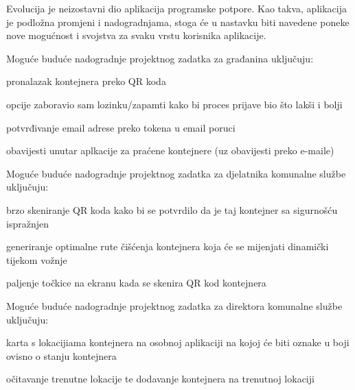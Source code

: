		Evolucija je neizostavni dio aplikacija programske potpore. Kao takva, aplikacija je podložna promjeni i nadogradnjama, stoga će u nastavku biti navedene poneke nove mogućnost i svojstva za svaku vrstu korisnika aplikacije.
		
		Moguće buduće nadogradnje projektnog zadatka za građanina uključuju:
		\begin{packed_item}
			
			\item pronalazak kontejnera preko QR koda
			\item opcije zaboravio sam lozinku/zapamti kako bi proces prijave bio što lakši i bolji
			\item potvrđivanje email adrese preko tokena u email poruci
			\item obavijesti unutar aplkacije za praćene kontejnere (uz obavijesti preko e-maile)
			
		\end{packed_item}
		
		Moguće buduće nadogradnje projektnog zadatka za djelatnika komunalne službe uključuju:
		\begin{packed_item}
			
			\item brzo skeniranje QR koda kako bi se potvrdilo da je taj kontejner sa sigurnošću ispražnjen
			\item generiranje optimalne rute čišćenja kontejnera koja će se mijenjati dinamički tijekom vožnje
			\item paljenje točkice na ekranu kada se skenira QR kod kontejnera
			
		\end{packed_item}
	
		Moguće buduće nadogradnje projektnog zadatka za direktora komunalne službe uključuju:
		\begin{packed_item}
			
			\item karta s lokacijiama kontejnera na osobnoj aplikaciji na kojoj će biti oznake u boji ovisno o stanju kontejnera
			\item očitavanje trenutne lokacije te dodavanje kontejnera na trenutnoj lokaciji
			
		\end{packed_item}
		\eject
